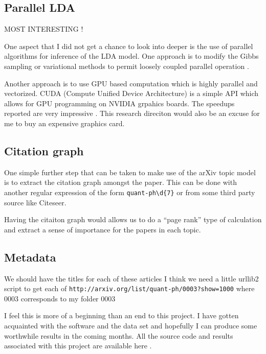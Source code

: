 \documentclass[11pt]{article}
\begin{document}
	\subsection{Parallel LDA}

        MOST INTERESTING !

        One aspect that I did not get a chance to look into deeper is the use of parallel algorithms
        for inference of the LDA model.
        One approach is to modify the Gibbs sampling or variational methods to permit loosely
        coupled parallel operation \cite{newman2006scalable,newman2007distributed}. 

        Another approach is to use GPU based computation which is highly parallel and vectorized.
        CUDA (Compute Unified Device Architecture) is a simple API which allows for GPU programming
        on NVIDIA grpahics boards. The speedups reported are very impressive
        \cite{masada2009accelerating, yan-parallel}.
        This research direciton would also be an excuse for me to buy an expensive graphics card.

			
    \subsection{Citation graph}

        One simple further step that can be taken to make use of the arXiv topic model 
        is to extract the citation graph amongst the paper. This can be done with another
        regular expression of the form \verb|quant-ph\d{7}| or from some third party
        source like Citeseer.
        
        Having the citaiton graph would allows us to do a ``page rank'' type of calculation
        and extract a sense of importance for the papers in each topic.


    \subsection{Metadata}
        We should have the titles for each of these articles I think
        we need a little urllib2 script to get each of
        \verb|http://arxiv.org/list/quant-ph/0003?show=1000|
        where 0003 corresponds to my folder 0003 


    
    \vspace{0.3in}

    I feel this is more of a beginning than an end to this project.
    I have gotten acquainted with the software and the data set and hopefully I can produce
    some worthwhile results in the coming months.
    All the source code and results associated with this project are available here \cite{IvanCode}.







\end{document}
